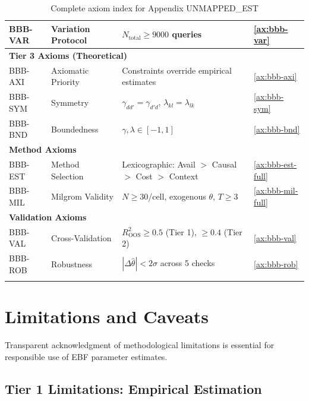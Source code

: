 \documentclass[11pt,a4paper]{article}
\theoremstyle{definition}
\begin{document}
\begin{longtable}{llp{7cm}l}
BBB-VAR & Variation Protocol & $N_{\text{total}} \geq 9000$ queries & \ref{ax:bbb-var} \\
\midrule
\multicolumn{4}{l}{\textbf{Tier 3 Axioms (Theoretical)}} \\
BBB-AXI & Axiomatic Priority & Constraints override empirical estimates & \ref{ax:bbb-axi} \\
BBB-SYM & Symmetry & $\gamma_{dd'} = \gamma_{d'd}$, $\lambda_{kl} = \lambda_{lk}$ & \ref{ax:bbb-sym} \\
BBB-BND & Boundedness & $\gamma, \lambda \in [-1, 1]$ & \ref{ax:bbb-bnd} \\
\midrule
\multicolumn{4}{l}{\textbf{Method Axioms}} \\
BBB-EST & Method Selection & Lexicographic: Avail $>$ Causal $>$ Cost $>$ Context & \ref{ax:bbb-est-full} \\
BBB-MIL & Milgrom Validity & $N \geq 30$/cell, exogenous $\theta$, $T \geq 3$ & \ref{ax:bbb-mil-full} \\
\midrule
\multicolumn{4}{l}{\textbf{Validation Axioms}} \\
BBB-VAL & Cross-Validation & $R^2_{\text{OOS}} \geq 0.5$ (Tier 1), $\geq 0.4$ (Tier 2) & \ref{ax:bbb-val} \\
BBB-ROB & Robustness & $|\Delta\hat{\theta}| < 2\sigma$ across 5 checks & \ref{ax:bbb-rob} \\
\bottomrule
\caption{Complete axiom index for Appendix UNMAPPED_EST}
\label{tab:bbb-axiom-index}
\end{longtable}





\section{Limitations and Caveats}
\label{sec:bbb-limitations}

Transparent acknowledgment of methodological limitations is essential for 
responsible use of EBF parameter estimates.

\subsection{Tier 1 Limitations: Empirical Estimation}
\end{document}
